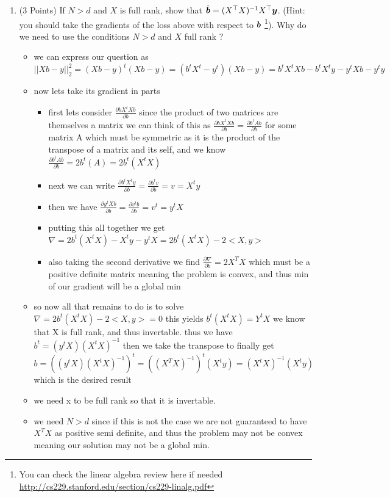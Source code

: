 \documentclass{article}
\newcommand{\bb}{b}
\begin{document}
\begin{enumerate}
    \item (3 Points) If $N > d$ and $X$ is full rank, show that $\hat{\bs \bb} = (X^\top X)^{-1}X^\top \bs y$. (Hint: you should take the gradients of the loss above with respect to $\bs \bb$ \footnote{You can check the linear algebra review here if needed \url{http://cs229.stanford.edu/section/cs229-linalg.pdf}}). Why do we need to use the conditions $N > d$ and $X$ full rank ?  
    \begin{itemize}
        \item we can express our question as $||Xb-y||_{2}^{2}=(Xb-y)^t(Xb-y)=(b^tX^t-y^t)(Xb-y)=b^tX^tXb-b^tX^ty-y^tXb-y^ty$
        \item now lets take its gradient in parts
        \begin{itemize}
            \item first lets consider $\frac{\partial bX^tXb}{\partial b}$ since the product of two matrices are themselves a matrix we can think of this as $\frac{\partial bX^tXb}{\partial b}=\frac{\partial b^tAb}{\partial b}$ for some matrix A which must be symmetric as it is the product of the transpose of a matrix and its self, and we know $\frac{\partial b^tAb}{\partial b}=2b^t(A)=2b^{t}(X^tX)$
            \item next we can write $\frac{\partial b^tX^ty}{\partial b}=\frac{\partial b^tv}{\partial b}=v=X^ty$
            \item then we have $\frac{\partial y^{t}Xb}{\partial b}=\frac{\partial v^{t}b}{\partial b}=v^t=y^tX$
            \item putting this all together we get $\nabla=2b^{t}(X^tX)-X^ty-y^tX=2b^{t}(X^tX)-2<X,y>$
            \item also taking the second derivative we find $\frac{\partial \nabla}{\partial b}=2X^TX$ which must be a positive definite matrix meaning the problem is convex, and thus min of our gradient will be a global min 
        \end{itemize}
        \item so now all that remains to do is to solve $\nabla=2b^{t}(X^tX)-2<X,y>=0$ this yields $b^{t}(X^{t}X)=Y^tX$ we know that X is full rank, and thus invertable.   thus we have $b^t=(y^tX)(X^{t}X)^{-1}$ then we take the transpose to finally get $b=((y^tX)(X^{t}X)^{-1})^{t}=((X^{T}X)^{-1})^t(X^{t}y)=(X^{t}X)^{-1}(X^{t}y)$ which is the desired result
        \item we need x to be full rank so that it is invertable. 
        \item we need $N>d$ since if this is not the case we are not guaranteed to have  $X^TX$ as positive semi definite, and thus the problem may not be convex meaning our solution may not be a global min. 

    \end{itemize}

    
    
\setcounter{saveenum}{\value{enumi}}  
\end{enumerate}
\end{document}
